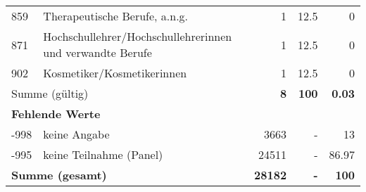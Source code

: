 \begin{longtable}{lXrrr}
     859 &
     \multicolumn{1}{X}{ Therapeutische Berufe, a.n.g.   } &


       \num{1} &
       \num[round-mode=places,round-precision=2]{12,5} &
         \num[round-mode=places,round-precision=2]{0} \\

     871 &
     \multicolumn{1}{X}{ Hochschullehrer/Hochschullehrerinnen und verwandte Berufe   } &


       \num{1} &
       \num[round-mode=places,round-precision=2]{12,5} &
         \num[round-mode=places,round-precision=2]{0} \\

     902 &
     \multicolumn{1}{X}{ Kosmetiker/Kosmetikerinnen   } &


       \num{1} &
       \num[round-mode=places,round-precision=2]{12,5} &
         \num[round-mode=places,round-precision=2]{0} \\
     \midrule
     \multicolumn{2}{l}{Summe (gültig)} &
       \textbf{\num{8}} &
     \textbf{100} &
       \textbf{\num[round-mode=places,round-precision=2]{0,03}} \\
     \multicolumn{5}{l}{\textbf{Fehlende Werte}}\\
       -998 &
       keine Angabe &
         \num{3663} &
        - &
         \num[round-mode=places,round-precision=2]{13} \\
       -995 &
       keine Teilnahme (Panel) &
         \num{24511} &
        - &
         \num[round-mode=places,round-precision=2]{86,97} \\
     \midrule
     \multicolumn{2}{l}{\textbf{Summe (gesamt)}} &
          \textbf{\num{28182}} &
        \textbf{-} &
        \textbf{100} \\
     \bottomrule
     \end{longtable}
     
